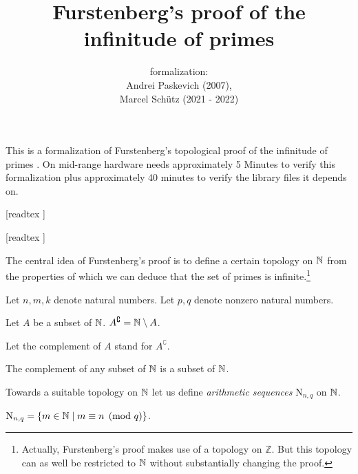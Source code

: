 \documentclass{article}
\title{Furstenberg's proof of the infinitude of primes}
\author{\Naproche formalization: \vspace{0.5em} \\
Andrei Paskevich (2007), \\
Marcel Schütz (2021 - 2022)}
\date{}
\newcommand{\N}{\mathrm{N}}
\newcommand{\Int}{\mathbb{Z}}
\begin{document}
  \maketitle

  \noindent This is a formalization of Furstenberg's topological proof of the
  infinitude of primes \cite[p. 353]{Furstenberg1955}.
  On mid-range hardware \Naproche needs approximately 5 Minutes to verify this
  formalization plus approximately 40 minutes to verify the library files it
  depends on.

  \begin{forthel}

    [readtex ]

    [readtex ]

  \end{forthel}

  The central idea of Furstenberg's proof is to define a certain topology on
  $\mathbb{N}$ from the properties of which we can deduce that the set of
  primes is infinite.\footnote{Actually, Furstenberg's proof makes use of a
  topology on $\Int$. But this topology can as well be restricted to
  $\mathbb{N}$ without substantially changing the proof.}

  \begin{forthel}
    Let $n, m, k$ denote natural numbers.
    Let $p, q$ denote nonzero natural numbers.

    \begin{definition}
      Let $A$ be a subset of $\mathbb{N}$.
      $A^{\complement} = \mathbb{N} \setminus A$.
    \end{definition}

    Let the complement of $A$ stand for $A^{\complement}$.

    \begin{lemma}
      The complement of any subset of $\mathbb{N}$ is a subset of $\mathbb{N}$.
    \end{lemma}
  \end{forthel}

  Towards a suitable topology on $\mathbb{N}$ let us define \textit{arithmetic
  sequences} $\N_{n, q}$ on $\mathbb{N}$.

  \begin{forthel}
    \begin{definition}
      $\N_{n, q} = \{ m \in \Nat \mid m \equiv n \pmod{q} \}$.
    \end{definition}
  \end{forthel}
\end{document}
